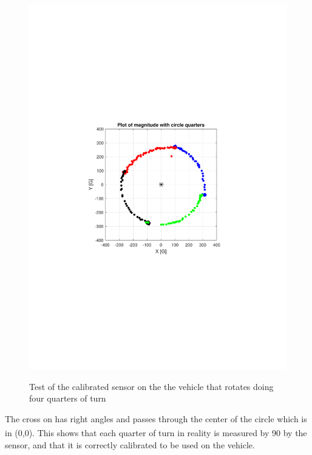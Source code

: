 \begin{figure}[H]
    \centering
  {
    \includegraphics[width=1.4\textwidth]{figures/fullturn2.pdf}
  }
  \caption{Test of the calibrated sensor on the the vehicle that rotates doing four quarters of turn}
  \label{fig:calibrationTestQuarterResults}
\end{figure}\vspace{-5mm}


The cross on  has right angles and passes through the center of the circle which is in (0,0). This shows that each quarter of turn in reality is measured by \si{90^{\circ}} by the sensor, and that it is correctly calibrated to be used on the vehicle.
